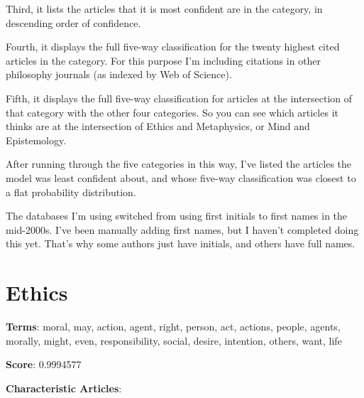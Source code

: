 \documentclass[
  10pt,
  letterpaper,
  DIV=11,
  numbers=noendperiod,
  twoside]{scrartcl}
\begin{document}
Third, it lists the articles that it is most confident are in the
category, in descending order of confidence.

Fourth, it displays the full five-way classification for the twenty
highest cited articles in the category. For this purpose I'm including
citations in other philosophy journals (as indexed by Web of Science).

Fifth, it displays the full five-way classification for articles at the
intersection of that category with the other four categories. So you can
see which articles it thinks are at the intersection of Ethics and
Metaphysics, or Mind and Epistemology.

After running through the five categories in this way, I've listed the
articles the model was least confident about, and whose five-way
classification was closest to a flat probability distribution.

The databases I'm using switched from using first initials to first
names in the mid-2000s. I've been manually adding first names, but I
haven't completed doing this yet. That's why some authors just have
initials, and others have full names.

\section{Ethics}\label{ethics}

\textbf{Terms}: moral, may, action, agent, right, person, act, actions,
people, agents, morally, might, even, responsibility, social, desire,
intention, others, want, life

\textbf{Score}: 0.9994577

\textbf{Characteristic Articles}:
\end{document}
